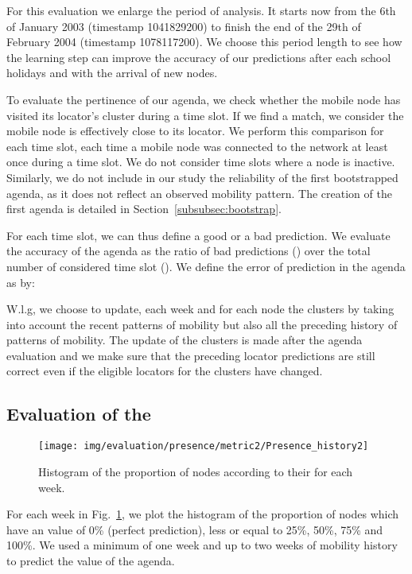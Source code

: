 \documentclass[a4paper]{sig-alternate-10pt}
\begin{document}
For this evaluation we enlarge the period of analysis. It starts now
from the 6th of January 2003 (timestamp 1041829200) to finish the
end of the 29th of February 2004 (timestamp 1078117200). We choose
this period length to see how the learning step can improve the
accuracy of our predictions after each school holidays and with the
arrival of new nodes.

To evaluate the pertinence of our agenda, we check whether the
mobile node has visited its locator's cluster during a time slot.
If we find a match, we consider the mobile node is effectively
close to its locator. We perform this comparison for each time
slot, each time a mobile node was connected to the network at least
once during a time slot. We do not consider time slots where a node
is inactive. Similarly, we do not include in our study the
reliability of the first bootstrapped agenda, as it does not
reflect an observed mobility pattern. The creation of the first
agenda is detailed in Section~\ref{subsubsec:bootstrap}.

For each time slot, we can thus define a good or a bad prediction.
We  evaluate the accuracy of the agenda as the ratio of bad
predictions () over the total number of
considered time slot  (). We define the error of
prediction in the agenda as  by:



W.l.g, we choose to update, each week and for each node the 
clusters by taking into account the recent patterns of mobility
but also all the preceding history of patterns of mobility. The 
update of the clusters is made after the agenda evaluation and 
we make sure that the preceding locator predictions are still 
correct even if the eligible locators for the clusters have changed.

\subsection{Evaluation of the }
\begin{figure}
\texttt{[image: img/evaluation/presence/metric2/Presence\_history2]}
\caption{Histogram of the proportion of nodes according to their
 for each week.} \label{fig:presence}
\end{figure}

For each week in Fig.~\ref{fig:presence}, we plot the histogram 
of the proportion of nodes which have an  value of
0\% (perfect prediction), less or equal to 25\%, 50\%, 75\% and
100\%.  We used a minimum of one week and up to two weeks of
mobility history to predict the value of the agenda.
\end{document}
